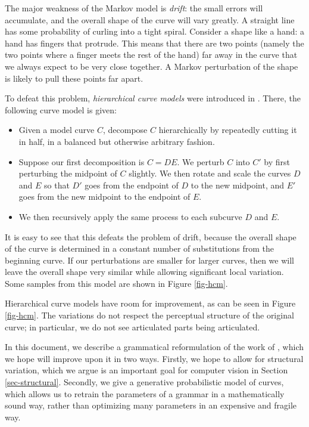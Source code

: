 \documentclass{article}
\begin{document}
The major weakness of the Markov model is \emph{drift}: the small
errors will accumulate, and the overall shape of the curve will vary
greatly. A straight line has some probability of curling into a tight
spiral. Consider a shape like a hand: a hand has fingers that
protrude. This means that there are two points (namely the two points
where a finger meets the rest of the hand) far away in the curve that
we always expect to be very close together. A Markov perturbation of
the shape is likely to pull these points far apart.

To defeat this problem, \emph{hierarchical curve models} were
introduced in \cite{hcm}. There, the following curve model is given:
\begin{itemize}
\item Given a model curve $C$, decompose $C$ hierarchically by
  repeatedly cutting it in half, in a balanced but otherwise arbitrary
  fashion.
\item Suppose our first decomposition is $C=DE$. We perturb $C$ into
  $C'$ by first perturbing the midpoint of $C$ slightly. We then
  rotate and scale the curves $D$ and $E$ so that $D'$ goes from the
  endpoint of $D$ to the new midpoint, and $E'$ goes from the new
  midpoint to the endpoint of $E$.
\item We then recursively apply the same process to each subcurve $D$
  and $E$. 
\end{itemize}
It is easy to see that this defeats the problem of drift, because the
overall shape of the curve is determined in a constant number of
substitutions from the beginning curve. If our perturbations are
smaller for larger curves, then we will leave the overall shape very
similar while allowing significant local variation. Some samples from
this model are shown in Figure \ref{fig-hcm}.

Hierarchical curve models have room for improvement, as can be seen in
Figure \ref{fig-hcm}. The variations do not respect the perceptual
structure of the original curve; in particular, we do not see
articulated parts being articulated.

In this document, we describe a grammatical reformulation of the work
of \cite{hcm}, which we hope will improve upon it in two
ways. Firstly, we hope to allow for structural variation, which we
argue is an important goal for computer vision in Section
\ref{sec-structural}. Secondly, we give a generative probabilistic model of
curves, which allows us to retrain the parameters of a grammar in a
mathematically sound way, rather than optimizing many parameters in an
expensive and fragile way.
\end{document}
